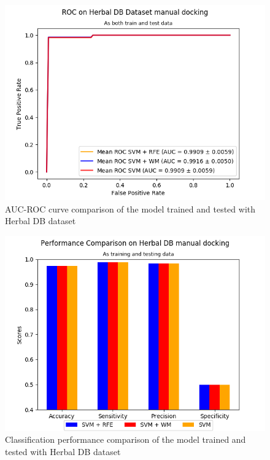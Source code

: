 \documentclass[conference,compsoc,12pt]{IEEEtran}
\begin{document}
	\begin{figure}
		\includegraphics[scale=0.5]{../images/03-evaluate-4_roc_chart.png}
		\caption{AUC-ROC curve comparison of the model trained and tested with Herbal DB dataset}
		\label{fig_roc_comparison_herbaldb_only}
	\end{figure}
	
	\begin{figure}
		\includegraphics[scale=0.5]{../images/03-evaluate-4_scores_chart.png}
		\caption{Classification performance comparison of the model trained and tested with Herbal DB dataset}
		\label{fig_performance_comparison_herbaldb_only}
	\end{figure}	
		
\end{document}
